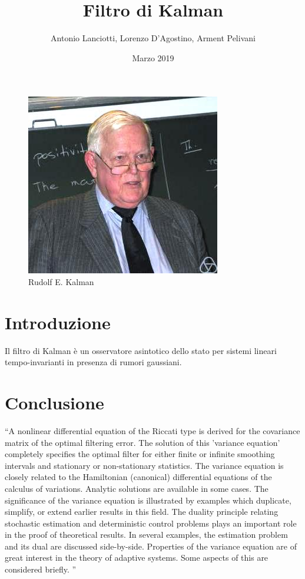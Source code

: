 \documentclass{article}
\title{Filtro di Kalman}
\author{Antonio Lanciotti, Lorenzo D'Agostino, Arment Pelivani}
\date{Marzo 2019}
\begin{document}
\maketitle

\begin{figure}[ht]
\centering
\includegraphics[scale=1]{Rudolf_Kalman.jpg} 
\caption{Rudolf E. Kalman}
\label{fig:kalman}
\end{figure}

\section{Introduzione}
Il filtro di Kalman è un osservatore asintotico dello stato per sistemi lineari tempo-invarianti in presenza di rumori gaussiani.

\newpage

\section{Conclusione}
``A nonlinear differential equation of the Riccati type is derived for the covariance matrix of the optimal filtering error. The solution of this 'variance equation' completely specifies the optimal filter for either finite or infinite smoothing intervals and stationary or non-stationary statistics.
The variance equation is closely related to the Hamiltonian (canonical) differential equations of the calculus of variations. Analytic solutions are available in some cases. The significance of the variance equation is illustrated by examples which duplicate, simplify, or extend earlier results in this field.
The duality principle relating stochastic estimation and deterministic control problems plays an important role in the proof of theoretical results. In several examples, the estimation problem and its dual are discussed side-by-side.
Properties of the variance equation are of great interest in the theory of adaptive systems. Some aspects of this are considered briefly. '' \citep{kalmanbucy}



\end{document}
